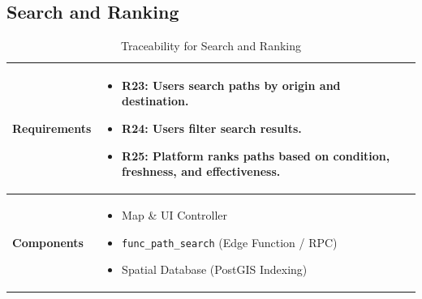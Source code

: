 \subsection{Search and Ranking}
\begin{table}[H]
    \centering
    \renewcommand{\arraystretch}{1.5}
    \begin{tabular}{|p{}|p{}|}
        \hline
        \textbf{Requirements} & 
        \begin{itemize}[nosep, leftmargin=*, label={}, before=\vspace{-0.6\baselineskip}, after=\strut]
            \item \textbf{R23:} Users search paths by origin and destination.
            \item \textbf{R24:} Users filter search results.
            \item \textbf{R25:} Platform ranks paths based on condition, freshness, and effectiveness.
        \end{itemize} \\
        \hline
        \textbf{Components} & 
        \begin{itemize}[nosep, leftmargin=*, before=\vspace{-0.6\baselineskip}, after=\strut]
            \item Map \& UI Controller
            \item \texttt{func\_path\_search} (Edge Function / RPC)
            \item Spatial Database (PostGIS Indexing)
        \end{itemize} \\
        \hline
    \end{tabular}
    \caption{Traceability for Search and Ranking}
\end{table}

